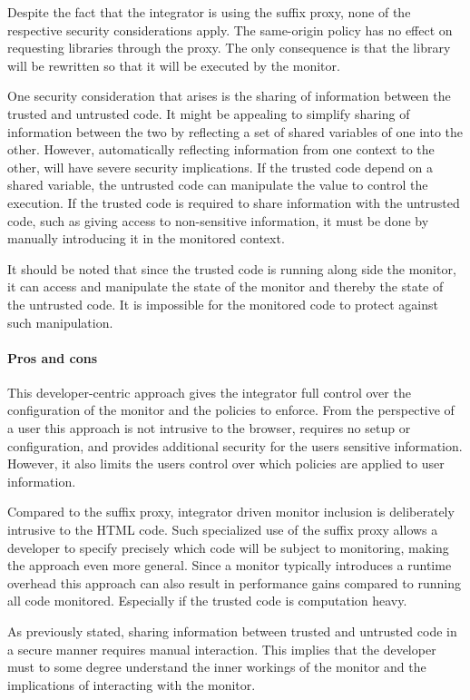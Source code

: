 \documentclass{llncs}
\begin{document}
Despite the fact that the integrator is using the suffix proxy, none of the 
respective security considerations apply. The same-origin policy has no effect 
on requesting libraries through the proxy. The only consequence is that the library
will be rewritten so that it will be executed by the monitor.

One security consideration that arises is the sharing of information between the 
trusted and untrusted code. It might be appealing to simplify sharing of 
information between the two by reflecting a set of shared variables of one into the other.
However, automatically 
reflecting information from one context to the other, will 
have severe security implications. If the trusted code depend on a 
shared variable, the untrusted code can manipulate the value to control the
execution.
If the trusted code is required to share information 
with the untrusted code, such as giving access to non-sensitive information, it 
must be done by manually introducing it in the monitored context.

It should be noted that since the trusted code is running along side the monitor, 
it can access and manipulate the state of the monitor and thereby the state of 
the untrusted code. It is impossible for the monitored code to protect against 
such manipulation.

\paragraph{Pros and cons}

This developer-centric approach gives the integrator full control over the 
configuration of the monitor and the policies to enforce. From the perspective of a user this 
approach is not intrusive to the browser, requires no setup or configuration, 
and provides additional security for the users sensitive information. However, 
it also limits the users control over which policies are applied to user information. 

Compared to the suffix proxy, integrator driven monitor 
inclusion is deliberately intrusive to the HTML code. Such specialized use of the suffix 
proxy allows a developer to specify precisely which code will be subject to 
monitoring, making the approach even more general. 
Since a monitor typically introduces a runtime overhead this approach can also 
result in performance gains compared to running all code monitored. Especially 
if the trusted code is computation heavy.

As previously stated, sharing information 
between trusted and untrusted code in a secure manner requires manual interaction. 
This implies that the developer must to some degree understand the inner workings of the monitor
and the implications of interacting with the monitor.
\end{document}
